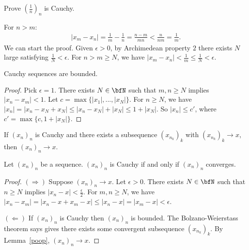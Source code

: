     \begin{example}
        Prove $\left(\frac{1}{n}\right)_n$ is Cauchy.
    \end{example}
        \begin{solution}
            For $n > m$:
                \begin{equation*}
                \begin{split}
                    |x_m - x_n| 
                    = \frac{1}{m} -\frac{1}{n} 
                    = \frac{n-m}{mn} 
                    < \frac{n}{nm} 
                    = \frac{1}{m}.
                \end{split}
                \end{equation*}
            We can start the proof. Given $\epsilon > 0$, by Archimedean property $2$ there exists $N$ large satisfying $\frac{1}{N} < \epsilon$. For $n > m \geq N$, we have $|x_m - x_n| < \frac{1}{m} \leq \frac{1}{N} < \epsilon$.
        \end{solution}

    \begin{proposition}
        Cauchy sequences are bounded.
    \end{proposition}
        \begin{proof}
            Pick $\epsilon = 1$. There exists $N \in  \bfN$ such that $m,n \geq N$ implies $|x_n - x_m| < 1$. Let $c = \max \{|x_1|,...,|x_N|\}$. For $n \geq N$, we have $|x_n| = |x_n - x_N + x_N| \leq |x_n - x_N| + |x_N| \leq 1+|x_N|$. So $|x_n| \leq c'$, where $c' = \max\{c, 1 + |x_N|\}$.
        \end{proof}

    \begin{lemma}
        If $(x_n)_n$ is Cauchy and there exists a subsequence $(x_{n_k})_k$ with $(x_{n_k})_k \rightarrow x$, then $(x_n)_n \rightarrow x$.
    \end{lemma}

    \begin{theorem}
        Let $(x_n)_n$ be a sequence. $(x_n)_n$ is Cauchy if and only if $(x_n)_n$ converges.
    \end{theorem}
        \begin{proof}
            $(\Rightarrow)$ Suppose $(x_n)_n \rightarrow x$. Let $\epsilon > 0$. There exists $N \in \bfN$ such that $n \geq N$ implies $|x_n - x| < \frac{\epsilon}{2}$. For $m,n \geq N$, we have $|x_n - x_m| = |x_n - x + x_m - x| \leq |x_n - x| = |x_m - x| < \epsilon$.

            $(\Leftarrow)$ If $(x_n)_n$ is Cauchy then $(x_n)_n$ is bounded. The Bolzano-Weierstass theorem says gives there exists some convergent subsequence $(x_{n_k})_k$. By Lemma~\ref{poop}, $(x_n)_n \rightarrow x$.
        \end{proof}